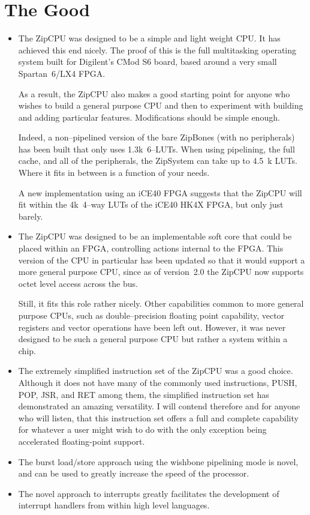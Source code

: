 \documentclass{gqtekspec}
\begin{document}
\section{The Good}
\begin{itemize}
\item The ZipCPU was designed to be a simple and light weight CPU.  It has
	achieved this end nicely.  The proof of this is the full multitasking
	operating system built for Digilent's CMod S6 board, based around
	a very small Spartan~6/LX4 FPGA. 

	As a result, the ZipCPU also makes a good starting point for anyone
	who wishes to build a general purpose CPU and then to experiment with
	building and adding particular features.  Modifications should be
	simple enough. 

	Indeed, a non--pipelined version of the bare ZipBones (with no
	peripherals) has been built that only uses 1.3k~6--LUTs.  When using
	pipelining, the full cache, and all of the peripherals, the ZipSystem
	can take up to 4.5~k LUTs.  Where it fits in between is a function of
	your needs.

	A new implementation using an iCE40 FPGA suggests that the ZipCPU
	will fit within the 4k~4--way LUTs of the iCE40 HK4X FPGA, but only
	just barely.

\item The ZipCPU was designed to be an implementable soft core that could be
	placed within an FPGA, controlling actions internal to the FPGA.  This
	version of the CPU in particular has been updated so that it would
	support a more general purpose CPU, since as of version~2.0 the ZipCPU
	now supports octet level access across the bus. 

	Still, it fits this role rather nicely.  Other capabilities common
	to more general purpose CPUs, such as 
	double--precision floating point capability, vector registers and
	vector operations have been left out.  However, it was never designed
	to be such a general purpose CPU but rather a system within a chip.  

\item The extremely simplified instruction set of the ZipCPU was a good
	choice. Although it does not have many of the commonly used
	instructions, PUSH, POP, JSR, and RET among them, the simplified
	instruction set has demonstrated an amazing versatility. I will contend
	therefore and for anyone who will listen, that this instruction set
	offers a full and complete capability for whatever a user might wish
	to do with the only exception being accelerated floating-point support.
\item The burst load/store approach using the wishbone pipelining mode is
	novel, and can be used to greatly increase the speed of the processor.
\item The novel approach to interrupts greatly facilitates the development of
	interrupt handlers from within high level languages.


\end{itemize}
\end{document}

